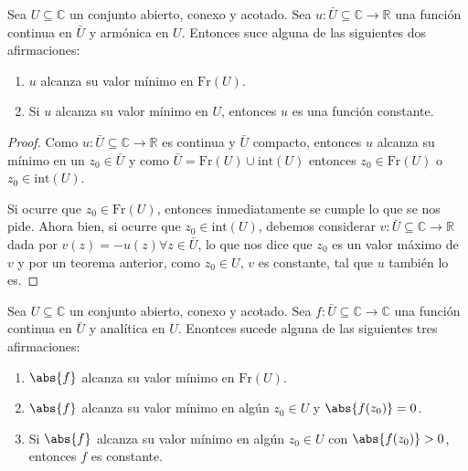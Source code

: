 \documentclass[../main.tex]{subfiles}
\begin{document}
\begin{theorem}
    Sea \(U \subseteq \mathbb{C}\) un conjunto abierto, conexo y acotado. Sea \(u \colon
    \bar{U} \subseteq \mathbb{C}\to \mathbb{R}\) una función continua en \(\bar{U}\) y
    armónica en \(U\). Entonces suce alguna de las siguientes dos afirmaciones:

    \begin{enumerate}
        \item \(u\) alcanza su valor mínimo en \(\mathrm{Fr}(U)\).
        \item Si \(u\) alcanza su valor mínimo en \(U\), entonces \(u\) es
            una función constante.
    \end{enumerate}
\end{theorem}

\begin{proof}
    Como \(u \colon \bar{U} \subseteq \mathbb{C} \to \mathbb{R}\) es continua y
    \(\bar{U}\) compacto, entonces \(u\) alcanza su mínimo en un \(z_{0}\in \bar{U}\) y
    como \(\bar{U} = \mathrm{Fr}(U) \cup \mathrm{int}(U)\) entonces \(z_{0}\in
    \mathrm{Fr}(U)\) o \(z_{0}\in \mathrm{int}(U)\).

    Si ocurre que \(z_{0}\in
    \mathrm{Fr}(U)\), entonces inmediatamente se cumple lo que se nos pide. Ahora bien,
    si ocurre que \(z_{0}\in \mathrm{int}(U)\), debemos considerar \(v \colon \bar{U}
    \subseteq \mathbb{C} \to \mathbb{R}\) dada por \(v(z) = -u(z) \forall z\in
    \bar{U}\), lo que nos dice que \(z_{0}\) es un valor máximo de \(v\) y por un
    teorema anterior, como \(z_{0}\in  U\), \(v\) es constante, tal que \(u\) también lo
    es.
\end{proof}

\begin{theorem}
    Sea \(U \subseteq \mathbb{C}\) un conjunto abierto, conexo y acotado. Sea \(f \colon
    \bar{U} \subseteq \mathbb{C}\to \mathbb{C}\) una función continua en \(\bar{U}\) y
    analítica en \(U\). Enontces sucede alguna de las siguientes tres afirmaciones:

    \begin{enumerate}
        \item \(\abs{f}\) alcanza su valor mínimo en \(\mathrm{Fr}(U)\).
        \item \(\abs{f}\) alcanza su valor mínimo en algún \(z_{0}\in  U\) y
            \(\abs{f(z_{0})}
            = 0\).
        \item Si \(\abs{f}\) alcanza su valor mínimo en algún \(z_{0}\in U\) con
            \(\abs{f(z_{0})} > 0\), entonces \(f\) es constante.
    \end{enumerate}
\end{theorem}
\end{document}
